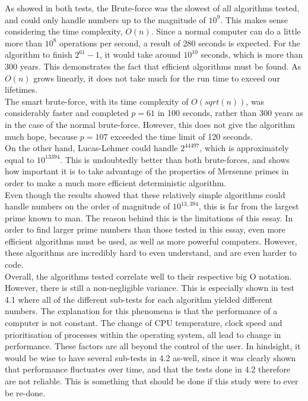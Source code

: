 \documentclass[main.tex]{subfiles}
\begin{document}

As showed in both tests, the Brute-force was the slowest of all algorithms
tested, and could only handle numbers up to the magnitude of $10^{9}$. This
makes sense considering the time complexity, $O(n)$. Since a normal computer can
do a little more than $10^{8}$ operations per second, a result of 280 seconds is
expected. For the algorithm to finish $2^{61}-1$, it would take around $10^{10}$
seconds, which is more than 300 years. This demonstrates the fact that efficient
algorithms must be found. As $O(n)$ grows linearly, it does not take much for
the run time to exceed our lifetimes. \\

The smart brute-force, with its time complexity of $O(sqrt(n))$, was
considerably faster and completed $p=61$ in 100 seconds, rather than 300 years
as in the case of the normal brute-force. However, this does not give the
algorithm much hope, because $p=107$ exceeded the time limit of 120 seconds. \\

On the other hand, Lucas-Lehmer could handle $2^{44497}$, which is approximately
equal to $10^{13394}$. This is undoubtedly better than both brute-forces, and
shows how important it is to take advantage of the properties of Mersenne primes
in order to make a much more efficient deterministic algorithm. \\
﻿ Even though the results showed that these relatively simple algorithms could
handle numbers on the order of magnitude of $10^{13,394}$, this is far from the
largest prime known to man. The reason behind this is the limitations of this
essay. In order to find larger prime numbers than those tested in this essay,
even more efficient algorithms must be used, as well as more powerful computers.
However, these algorithms are incredibly hard to even understand, and are even
harder to code. \\

Overall, the algorithms tested correlate well to their respective big O
notation. However, there is still a non-negligible variance. This is especially
shown in test 4.1 where all of the different sub-tests for each algorithm
yielded different numbers. The explanation for this phenomena is that the
performance of a computer is not constant. The change of CPU temperature, clock
speed and prioritisation of processes within the operating system, all lead to
change in performance. These factors are all beyond the control of the user. In
hindsight, it would be wise to have several sub-tests in 4.2 as-well, since it
was clearly shown that performance fluctuates over time, and that the tests done
in 4.2 therefore are not reliable. This is something that should be done if this
study were to ever be re-done. \\
\end{document}
